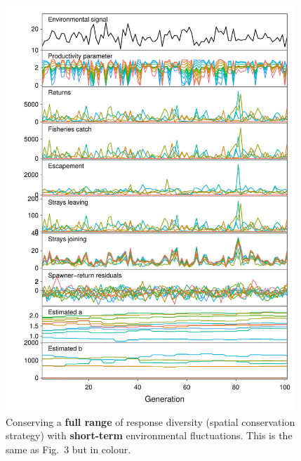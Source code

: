 \begin{figure}[htbp]
\centering
\includegraphics[width=4.3in]{metafolio/spatial-arma-sim-full-colour}
\caption[Conserving a \textbf{full range} of response diversity (spatial
conservation strategy) with \textbf{short-term} environmental fluctuations.]{Conserving a \textbf{full range} of response diversity (spatial
conservation strategy) with \textbf{short-term} environmental fluctuations. This is the same as Fig.~3 but in colour.}
\label{f:eg-sp-arma-full}
\end{figure}

\clearpage

